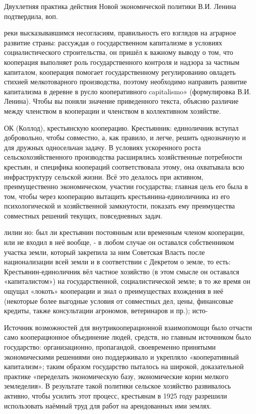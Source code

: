 Двухлетняя практика действия Новой экономической политики В.И. Ленина подтвердила, воп.

реки высказывавшимся несогласиям, правильность его взглядов на аграрное развитие страны: рассуждая о государственном капитализме в условиях социалистического строительства, он пришёл к важному выводу о том, что кооперация выполняет роль государственного контроля и надзора за частным капиталом, кооперация помогает государственному регулированию овладеть стихией мелкотоварного производства, поэтому необходимо направить развитие капитализма в деревне в русло кооперативного capitalismo» (формулировка В.И. Ленина). Чтобы вы поняли значение приведенного текста, объясню различие между членством в кооперации и членством в коллективном хозяйстве.

ОК (Коллод), крестьянскую кооперацию. Крестьянник: единоличник вступал добровольно, чтобы совместно, а, как правило, и легче, решить однозначную и для дружных односельчан задачу. В условиях ускоренного роста сельскохозяйственного производства расширялись хозяйственные потребности крестьян, и специфика коопераций соответствовала этому, она охватывала всю инфраструктуру сельской жизни. Всё это делалось при активном, преимущественно экономическом, участии государства; главная цель его была в том, чтобы через кооперацию вытащить крестьянина-единоличника из его психологической и хозяйственной замкнутости, показать ему преимущества совместных решений текущих, повседневных задач.

лилии но: был ли крестьянин постоянным или временным членом кооперации, или не входил в неё вообще, - в любом случае он оставался собственником участка земли, который закрепила за ним Советская Власть после национализации всей земли и в соответствии с Декретом о земле, то есть: Крестьянин-единоличник вёл частное хозяйство (в этом смысле он оставался «капиталистом») на государственной, социалистической земле; в то же время он ощущал «локоть» кооперации и знал о преимуществах вхождения в неё (некоторые более выгодные условия от совместных дел, цены, финансовые кредиты, также консультации агрономов, ветеринаров и пр.); исто-

Источник возможностей для внутрикооперационной взаимопомощи было отчасти само кооперационное объединение людей, средств, но главным источником было государство: организационно, пропагандой, своевременно принятыми экономическими решениями оно поддерживало и укрепляло «кооперативный капитализм»; таким образом государство пыталось на широкой, доказательной практике «переделать экономическую базу, экономические корни мелкого земледелия». В результате такой политики сельское хозяйство развивалось активно, чтобы усилить этот процесс, крестьянам в 1925 году разрешили использовать наёмный труд для работ на арендованных ими землях.

